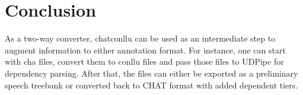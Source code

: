 \chapter{Conclusion} %

\label{Chapter6} %

As a two-way converter, chatconllu can be used as an intermediate step to augment information to either annotation format. For instance, one can start with cha files, convert them to conllu files and pass those files to UDPipe for dependency parsing. After that, the files can either be exported as a preliminary speech treebank or converted back to CHAT format with added dependent tiers.

